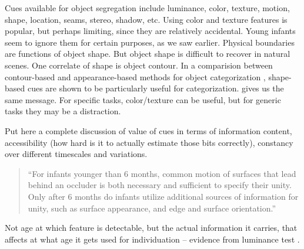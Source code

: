 Cues available for object segregation include luminance, color,
texture, motion, shape, location, seams, stereo, shadow, etc.
%
Using color and texture features is popular, but perhaps limiting, since they
are relatively accidental.  Young infants seem to ignore them for
certain purposes, as we saw earlier.
%
Physical boundaries are functions of object shape.  But object shape
is difficult to recover in natural scenes.
%
One correlate of shape is object contour.  In a comparision between
contour-based and appearance-based methods for object categorization
\cite{leibe03analyzing}, shape-based cues are shown to be
particularly useful for categorization.
 gives us the same message.
For specific tasks, color/texture can be useful, but for 
generic tasks they may be a distraction.

\fi


\ifverbose
Put here a complete discussion of value of cues in terms of
information content, accessibility (how hard is it to actually
estimate those bits correctly), constancy over different timescales
and variations.
\fi


\nocite{serre05object}
\nocite{swain91color}
\nocite{schiele00recognition}
\nocite{lowe04distinctive}
\nocite{felzenszwalb04efficient}
\nocite{quinn05learning}
\nocite{felzenszwalb04efficient}
\nocite{gibson88exploratory}
\nocite{spelke90principles}
\nocite{martin01database}
\nocite{madison01use}
\nocite{scharstein02taxonomy}
\nocite{feldman05information}
\nocite{mareschal02learning}
\nocite{wilcox99object}
\nocite{dannemiller87test}
\nocite{wilcox04priming}
\nocite{johnson96perception}
\nocite{needham05infants}
\nocite{johnson00infants}
\nocite{johnson03development}

\ifverbose
\begin{quote}

``For infants younger than 6 months, common motion of surfaces that lead
behind an occluder is both necessary and sufficient to specify their
unity. Only after 6 months do infants utilize additional sources of
information for unity, such as surface appearance, and edge and
surface orientation.'' \cite{mareschal02learning}

\end{quote}


Not age at which feature is detectable, but the actual
information it carries, that affects at what age it gets used for
individuation -- evidence from luminance test \cite{woods05infants}.

